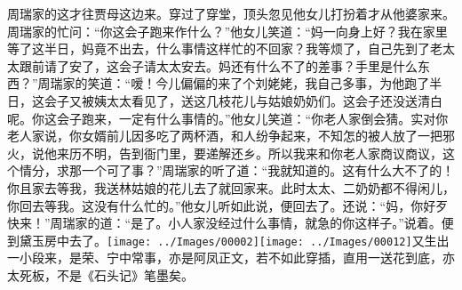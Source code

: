 周瑞家的这才往贾母这边来。穿过了穿堂，顶头忽见他女儿打扮着才从他婆家来。周瑞家的忙问：``你这会子跑来作什么？''他女儿笑道：``妈一向身上好？我在家里等了这半日，妈竟不出去，什么事情这样忙的不回家？我等烦了，自己先到了老太太跟前请了安了，这会子请太太安去。妈还有什么不了的差事？手里是什么东西？''周瑞家的笑道：``嗳！今儿偏偏的来了个刘姥姥，我自己多事，为他跑了半日，这会子又被姨太太看见了，送这几枝花儿与姑娘奶奶们。这会子还没送清白呢。你这会子跑来，一定有什么事情的。''他女儿笑道：``你老人家倒会猜。实对你老人家说，你女婿前儿因多吃了两杯酒，和人纷争起来，不知怎的被人放了一把邪火，说他来历不明，告到衙门里，要递解还乡。所以我来和你老人家商议商议，这个情分，求那一个可了事？''周瑞家的听了道：``我就知道的。这有什么大不了的！你且家去等我，我送林姑娘的花儿去了就回家来。此时太太、二奶奶都不得闲儿，你回去等我。这没有什么忙的。''他女儿听如此说，便回去了。还说：``妈，你好歹快来！''周瑞家的道：``是了。小人家没经过什么事情，就急的你这样子。''说着。便到黛玉房中去了。{\texttt{[image: ../Images/00002]}\texttt{[image: ../Images/00012]}\footnotesize \kaishu 又生出一小段来，是荣、宁中常事，亦是阿凤正文，若不如此穿插，直用一送花到底，亦太死板，不是《石头记》笔墨矣。}

